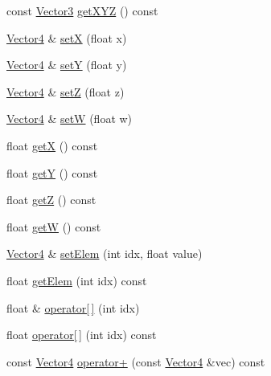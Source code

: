 \begin{DoxyCompactItemize}
\item 
const \hyperlink{classVectormath_1_1Aos_1_1Vector3}{Vector3} \hyperlink{classVectormath_1_1Aos_1_1Vector4_ac55e276ad09b33112ff0daf7d30a461b}{get\-X\-Y\-Z} () const 
\item 
\hyperlink{classVectormath_1_1Aos_1_1Vector4}{Vector4} \& \hyperlink{classVectormath_1_1Aos_1_1Vector4_aed8b6b147cfec63c5a17069d28365238}{set\-X} (float x)
\item 
\hyperlink{classVectormath_1_1Aos_1_1Vector4}{Vector4} \& \hyperlink{classVectormath_1_1Aos_1_1Vector4_a16f0f7178d46611017f69ee6b4538743}{set\-Y} (float y)
\item 
\hyperlink{classVectormath_1_1Aos_1_1Vector4}{Vector4} \& \hyperlink{classVectormath_1_1Aos_1_1Vector4_a16cd96957d1a5dc19a7bc27d11d10e9c}{set\-Z} (float z)
\item 
\hyperlink{classVectormath_1_1Aos_1_1Vector4}{Vector4} \& \hyperlink{classVectormath_1_1Aos_1_1Vector4_abe04eac130d7a093a29372e90b40c6f0}{set\-W} (float w)
\item 
float \hyperlink{classVectormath_1_1Aos_1_1Vector4_af067fb75d2fdf3a88189229131f36329}{get\-X} () const 
\item 
float \hyperlink{classVectormath_1_1Aos_1_1Vector4_a895b1271a74265bb853772718aca2b24}{get\-Y} () const 
\item 
float \hyperlink{classVectormath_1_1Aos_1_1Vector4_a51336902d57b1c54df19fb708e93b4f2}{get\-Z} () const 
\item 
float \hyperlink{classVectormath_1_1Aos_1_1Vector4_a775bd40a8bd926cd510d39e890c0b686}{get\-W} () const 
\item 
\hyperlink{classVectormath_1_1Aos_1_1Vector4}{Vector4} \& \hyperlink{classVectormath_1_1Aos_1_1Vector4_a07b4a99492fa1443061e1701a261e23b}{set\-Elem} (int idx, float value)
\item 
float \hyperlink{classVectormath_1_1Aos_1_1Vector4_a8020669cc9b22410645efb136d1b74de}{get\-Elem} (int idx) const 
\item 
float \& \hyperlink{classVectormath_1_1Aos_1_1Vector4_ac13a6231dd4f4dbe1bb4fc56e065affd}{operator\mbox{[}$\,$\mbox{]}} (int idx)
\item 
float \hyperlink{classVectormath_1_1Aos_1_1Vector4_a6d4d332b6f54a5d8be0a8fe6b33f1311}{operator\mbox{[}$\,$\mbox{]}} (int idx) const 
\item 
const \hyperlink{classVectormath_1_1Aos_1_1Vector4}{Vector4} \hyperlink{classVectormath_1_1Aos_1_1Vector4_ae95d40ffcd7a96d9674c089e96999e1b}{operator+} (const \hyperlink{classVectormath_1_1Aos_1_1Vector4}{Vector4} \&vec) const 

\end{DoxyCompactItemize}
